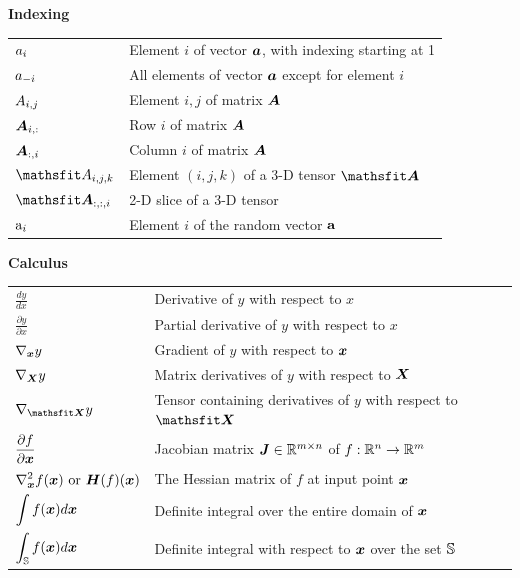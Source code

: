 \documentclass{article} %
\begin{document}
\centerline{\bf Indexing}
\bgroup
\def\arraystretch{1.5}

\begin{tabular}{p{1.25in}p{3.25in}}
$\displaystyle {a}_i$ & Element $i$ of vector ${\bm{a}}$, with indexing starting at 1 \\
$\displaystyle {a}_{-i}$ & All elements of vector ${\bm{a}}$ except for element $i$ \\
$\displaystyle {A}_{i,j}$ & Element $i, j$ of matrix ${\bm{A}}$ \\
$\displaystyle {\bm{A}}_{i, :}$ & Row $i$ of matrix ${\bm{A}}$ \\
$\displaystyle {\bm{A}}_{:, i}$ & Column $i$ of matrix ${\bm{A}}$ \\
$\displaystyle \etA_{i, j, k}$ & Element $(i, j, k)$ of a 3-D tensor $\tA$\\
$\displaystyle \tA_{:, :, i}$ & 2-D slice of a 3-D tensor\\
$\displaystyle {\textnormal{a}}_i$ & Element $i$ of the random vector ${\mathbf{a}}$ \\
\end{tabular}
\egroup
\vspace{0.25cm}


\centerline{\bf Calculus}
\bgroup
\def\arraystretch{1.5}
\begin{tabular}{p{1.25in}p{3.25in}}
$\displaystyle\frac{d y} {d x}$ & Derivative of $y$ with respect to $x$\\ [2ex]
$\displaystyle \frac{\partial y} {\partial x} $ & Partial derivative of $y$ with respect to $x$ \\
$\displaystyle \nabla_{\bm{x}} y $ & Gradient of $y$ with respect to ${\bm{x}}$ \\
$\displaystyle \nabla_{\bm{X}} y $ & Matrix derivatives of $y$ with respect to ${\bm{X}}$ \\
$\displaystyle \nabla_\tX y $ & Tensor containing derivatives of $y$ with respect to $\tX$ \\
$\displaystyle \frac{\partial f}{\partial {\bm{x}}} $ & Jacobian matrix ${\bm{J}} \in \mathbb{R}^{m\times n}$ of $f: \mathbb{R}^n \rightarrow \mathbb{R}^m$\\
$\displaystyle \nabla_{\bm{x}}^2 f({\bm{x}})\text{ or }{\bm{H}}( f)({\bm{x}})$ & The Hessian matrix of $f$ at input point ${\bm{x}}$\\
$\displaystyle \int f({\bm{x}}) d{\bm{x}} $ & Definite integral over the entire domain of ${\bm{x}}$ \\
$\displaystyle \int_{\mathbb{S}} f({\bm{x}}) d{\bm{x}}$ & Definite integral with respect to ${\bm{x}}$ over the set ${\mathbb{S}}$ \\
\end{tabular}
\egroup
\vspace{0.25cm}
\end{document}
